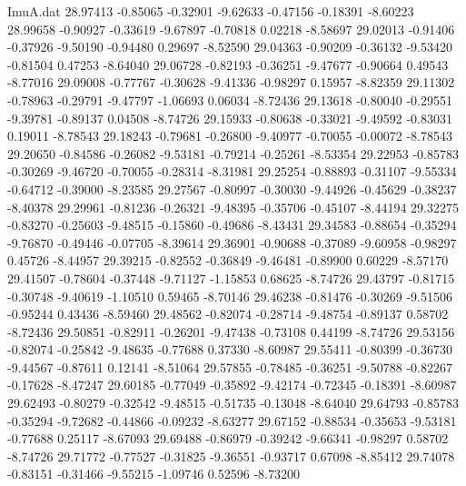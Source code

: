 \begin{filecontents}{ImuA.dat}
  28.97413   -0.85065   -0.32901   -9.62633   -0.47156   -0.18391   -8.60223
  28.99658   -0.90927   -0.33619   -9.67897   -0.70818    0.02218   -8.58697
  29.02013   -0.91406   -0.37926   -9.50190   -0.94480    0.29697   -8.52590
  29.04363   -0.90209   -0.36132   -9.53420   -0.81504    0.47253   -8.64040
  29.06728   -0.82193   -0.36251   -9.47677   -0.90664    0.49543   -8.77016
  29.09008   -0.77767   -0.30628   -9.41336   -0.98297    0.15957   -8.82359
  29.11302   -0.78963   -0.29791   -9.47797   -1.06693    0.06034   -8.72436
  29.13618   -0.80040   -0.29551   -9.39781   -0.89137    0.04508   -8.74726
  29.15933   -0.80638   -0.33021   -9.49592   -0.83031    0.19011   -8.78543
  29.18243   -0.79681   -0.26800   -9.40977   -0.70055   -0.00072   -8.78543
  29.20650   -0.84586   -0.26082   -9.53181   -0.79214   -0.25261   -8.53354
  29.22953   -0.85783   -0.30269   -9.46720   -0.70055   -0.28314   -8.31981
  29.25254   -0.88893   -0.31107   -9.55334   -0.64712   -0.39000   -8.23585
  29.27567   -0.80997   -0.30030   -9.44926   -0.45629   -0.38237   -8.40378
  29.29961   -0.81236   -0.26321   -9.48395   -0.35706   -0.45107   -8.44194
  29.32275   -0.83270   -0.25603   -9.48515   -0.15860   -0.49686   -8.43431
  29.34583   -0.88654   -0.35294   -9.76870   -0.49446   -0.07705   -8.39614
  29.36901   -0.90688   -0.37089   -9.60958   -0.98297    0.45726   -8.44957
  29.39215   -0.82552   -0.36849   -9.46481   -0.89900    0.60229   -8.57170
  29.41507   -0.78604   -0.37448   -9.71127   -1.15853    0.68625   -8.74726
  29.43797   -0.81715   -0.30748   -9.40619   -1.10510    0.59465   -8.70146
  29.46238   -0.81476   -0.30269   -9.51506   -0.95244    0.43436   -8.59460
  29.48562   -0.82074   -0.28714   -9.48754   -0.89137    0.58702   -8.72436
  29.50851   -0.82911   -0.26201   -9.47438   -0.73108    0.44199   -8.74726
  29.53156   -0.82074   -0.25842   -9.48635   -0.77688    0.37330   -8.60987
  29.55411   -0.80399   -0.36730   -9.44567   -0.87611    0.12141   -8.51064
  29.57855   -0.78485   -0.36251   -9.50788   -0.82267   -0.17628   -8.47247
  29.60185   -0.77049   -0.35892   -9.42174   -0.72345   -0.18391   -8.60987
  29.62493   -0.80279   -0.32542   -9.48515   -0.51735   -0.13048   -8.64040
  29.64793   -0.85783   -0.35294   -9.72682   -0.44866   -0.09232   -8.63277
  29.67152   -0.88534   -0.35653   -9.53181   -0.77688    0.25117   -8.67093
  29.69488   -0.86979   -0.39242   -9.66341   -0.98297    0.58702   -8.74726
  29.71772   -0.77527   -0.31825   -9.36551   -0.93717    0.67098   -8.85412
  29.74078   -0.83151   -0.31466   -9.55215   -1.09746    0.52596   -8.73200

\end{filecontents}
